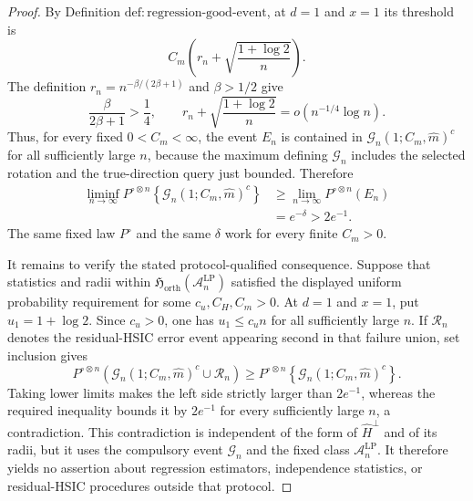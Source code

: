 \documentclass{article}
\begin{document}
\begin{proof}
By Definition \(\mathrm{def:regression\text{-}good\text{-}event}\), at \(d=1\) and \(x=1\) its threshold is
\[
C_m\left(r_n+\sqrt{\frac{1+\log2}{n}}\right).
\]
The definition \(r_n=n^{-\beta/(2\beta+1)}\) and \(\beta>1/2\) give
\[
\frac{\beta}{2\beta+1}>\frac14,
\qquad
r_n+\sqrt{\frac{1+\log2}{n}}
=o\!\left(n^{-1/4}\log n\right).
\]
Thus, for every fixed \(0<C_m<\infty\), the event \(E_n\) is contained in \(\mathcal G_n(1;C_m,\widehat m)^c\) for all sufficiently large \(n\), because the maximum defining \(\mathcal G_n\) includes the selected rotation and the true-direction query just bounded. Therefore
\[
\begin{aligned}
\liminf_{n\to\infty}
P^{\circ\otimes n}\!\left\{\mathcal G_n(1;C_m,\widehat m)^c\right\}
&\ge\lim_{n\to\infty}P^{\circ\otimes n}(E_n)\\
&=e^{-\delta}>2e^{-1}.
\end{aligned}
\]
The same fixed law \(P^\circ\) and the same \(\delta\) work for every finite \(C_m>0\).

It remains to verify the stated protocol-qualified consequence. Suppose that statistics and radii within \(\mathfrak H_{\mathrm{orth}}(\mathcal A_n^{\mathrm{LP}})\) satisfied the displayed uniform probability requirement for some \(c_u,C_H,C_m>0\). At \(d=1\) and \(x=1\), put \(u_1=1+\log2\). Since \(c_u>0\), one has \(u_1\le c_u n\) for all sufficiently large \(n\). If \(\mathcal R_n\) denotes the residual-HSIC error event appearing second in that failure union, set inclusion gives
\[
P^{\circ\otimes n}\!\left(
\mathcal G_n(1;C_m,\widehat m)^c\cup\mathcal R_n
\right)
\ge
P^{\circ\otimes n}\!\left\{\mathcal G_n(1;C_m,\widehat m)^c\right\}.
\]
Taking lower limits makes the left side strictly larger than \(2e^{-1}\), whereas the required inequality bounds it by \(2e^{-1}\) for every sufficiently large \(n\), a contradiction. This contradiction is independent of the form of \(\widehat H^\perp\) and of its radii, but it uses the compulsory event \(\mathcal G_n\) and the fixed class \(\mathcal A_n^{\mathrm{LP}}\). It therefore yields no assertion about regression estimators, independence statistics, or residual-HSIC procedures outside that protocol.
\end{proof}
\end{document}
